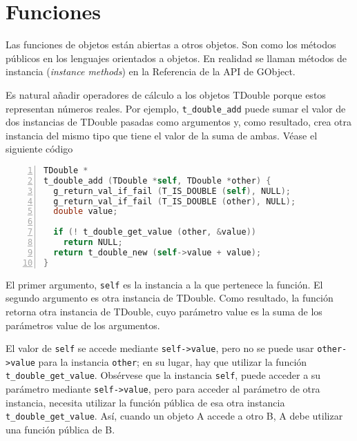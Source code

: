 \section{Funciones}
Las funciones de objetos están abiertas a otros objetos. Son como los métodos públicos en los lenguajes
orientados a objetos.
En realidad se llaman métodos de instancia (\emph{instance methods}) en la Referencia de la API de GObject.

Es natural añadir operadores de cálculo a los objetos \textsf{TDouble} porque estos representan números
reales. Por ejemplo, \texttt{t\_double\_add} puede sumar el valor de dos instancias de \textsf{TDouble}
pasadas como argumentos y, como resultado, crea otra instancia del mismo tipo que tiene el valor de la
suma de ambas. Véase  el siguiente código
\begin{lstlisting}[language=C, numbers=left]
TDouble *
t_double_add (TDouble *self, TDouble *other) {
  g_return_val_if_fail (T_IS_DOUBLE (self), NULL);
  g_return_val_if_fail (T_IS_DOUBLE (other), NULL);
  double value;

  if (! t_double_get_value (other, &value))
    return NULL;
  return t_double_new (self->value + value);
}
\end{lstlisting}
El primer argumento, \texttt{self} es la instancia a la que pertenece la función. El segundo argumento es otra
instancia de \textsf{TDouble}. Como resultado, la función retorna otra instancia de \textsf{TDouble}, cuyo
parámetro \textsf{value} es la suma de los parámetros \textsf{value} de los argumentos.

El valor de \texttt{self} se accede mediante \texttt{self->value}, pero no se puede usar \texttt{other->value}
para la instancia \texttt{other}; en su lugar, hay que utilizar la función \texttt{t\_double\_get\_value}.
Obsérvese que la instancia \texttt{self}, puede acceder a su parámetro mediante \texttt{self->value},
pero para acceder al parámetro de otra instancia, necesita utilizar la función pública de esa otra
instancia \texttt{t\_double\_get\_value}. Así, cuando un objeto A accede a otro B, A debe utilizar una
función pública de B.



